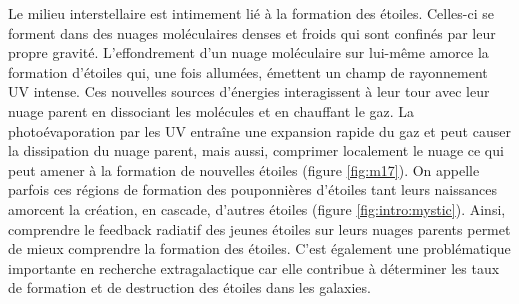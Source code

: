 \documentclass[11pt,a4paper,twoside,openright]{article}
\begin{document}
\begin{spacing}{0.98}

Le milieu interstellaire est intimement lié à la formation des étoiles. Celles-ci se forment dans des nuages moléculaires denses et froids qui sont confinés par leur propre gravité. L'effondrement d'un nuage moléculaire sur lui-même amorce la formation d'étoiles qui, une fois allumées, émettent un champ de rayonnement UV intense. Ces nouvelles sources d'énergies interagissent à leur tour avec leur nuage parent en dissociant les molécules et en chauffant le gaz. La photoévaporation par les UV entraîne une expansion rapide du gaz et peut causer la dissipation du nuage parent, mais aussi, comprimer localement le nuage ce qui peut amener à la formation de nouvelles étoiles (figure \ref{fig:m17}). On appelle parfois ces régions de formation des \og pouponnières d'étoiles \fg{} tant leurs naissances amorcent la création, en cascade, d'autres étoiles (figure \ref{fig:intro:mystic}). Ainsi, comprendre le feedback radiatif des jeunes étoiles sur leurs nuages parents permet de mieux comprendre la formation des étoiles. C'est également une problématique importante en recherche extragalactique car elle contribue à déterminer les taux de formation et de destruction des étoiles dans les galaxies. \newline 



\end{spacing}
\end{document}
